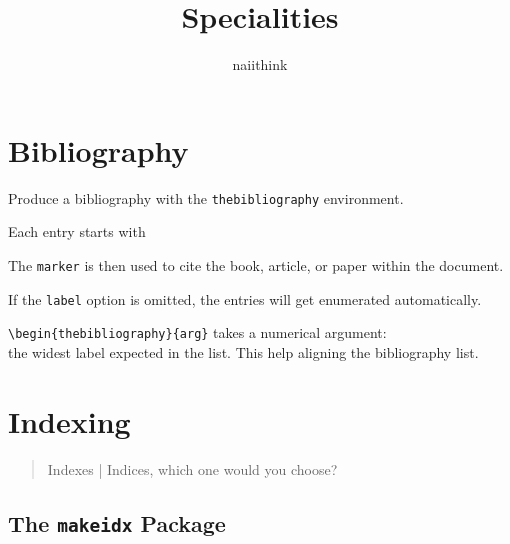\documentclass[a4paper]{article}
\title{Specialities}
\author{naiithink}
\date{}
\begin{document}
\begin{titlepage}
\maketitle
\thispagestyle{empty}
\tableofcontents
\end{titlepage}

\newpage
{}
\section{Bibliography}
Produce a bibliography with the \verb|thebibliography|  environment.

Each entry starts with

\rule{0em}{2ex}


\rule{0em}{2ex}

The \texttt{marker} is then used to cite the book, article, or paper within the document.

\rule{0em}{2ex}


\rule{0em}{2ex}

If the \verb|label| option is omitted, the entries will get enumerated automatically.

\rule{0em}{2ex}

\verb|\begin{thebibliography}{arg}| takes a numerical argument:\\
the widest label expected in the list. This help aligning the \mbox{bibliography} list.


\newpage
\section{Indexing}

\begin{quote}
Indexes | Indices, which one would you choose?
\end{quote}

\subsection{The \texttt{makeidx} Package}
\end{document}
